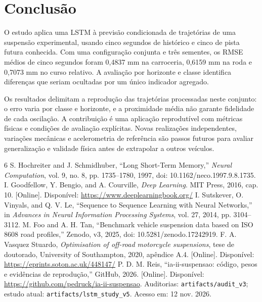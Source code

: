\documentclass[conference]{IEEEtran}
\begin{document}
\section{Conclusão}
O estudo aplica uma LSTM à previsão condicionada de trajetórias de uma suspensão experimental, usando cinco segundos de histórico e cinco de pista futura conhecida. Com uma configuração conjunta e três sementes, os RMSE médios de cinco segundos foram 0,4837 mm na carroceria, 0,6159 mm na roda e 0,7073 mm no curso relativo. A avaliação por horizonte e classe identifica diferenças que seriam ocultadas por um único indicador agregado.

Os resultados delimitam a reprodução das trajetórias processadas neste conjunto: o erro varia por classe e horizonte, e a proximidade média não garante fidelidade de cada oscilação. A contribuição é uma aplicação reprodutível com métricas físicas e condições de avaliação explícitas. Novas realizações independentes, variações mecânicas e acelerometria de referência são passos futuros para avaliar generalização e validade física antes de extrapolar a outros veículos.

\begin{thebibliography}{6}
 S. Hochreiter and J. Schmidhuber, ``Long Short-Term Memory,'' \emph{Neural Computation}, vol. 9, no. 8, pp. 1735--1780, 1997, doi: 10.1162/neco.1997.9.8.1735.
 I. Goodfellow, Y. Bengio, and A. Courville, \emph{Deep Learning}. MIT Press, 2016, cap. 10. [Online]. Disponível: \url{https://www.deeplearningbook.org/}
 I. Sutskever, O. Vinyals, and Q. V. Le, ``Sequence to Sequence Learning with Neural Networks,'' in \emph{Advances in Neural Information Processing Systems}, vol. 27, 2014, pp. 3104--3112.
 M. Foo and A. H. Tan, ``Benchmark vehicle suspension data based on ISO 8608 road profiles,'' Zenodo, v3, 2025, doi: 10.5281/zenodo.17242919.
 F. A. Vasquez Stuardo, \emph{Optimisation of off-road motorcycle suspensions}, tese de doutorado, University of Southampton, 2020, apêndice A.4. [Online]. Disponível: \url{https://eprints.soton.ac.uk/448147/}
 P. D. M. Reis, ``ia-ii-suspensao: código, pesos e evidências de reprodução,'' GitHub, 2026. [Online]. Disponível: \url{https://github.com/pedruck/ia-ii-suspensao}. Auditorias: \texttt{artifacts/audit\_v3}; estudo atual: \texttt{artifacts/lstm\_study\_v5}. Acesso em: 12 nov. 2026.
\end{thebibliography}
\end{document}
